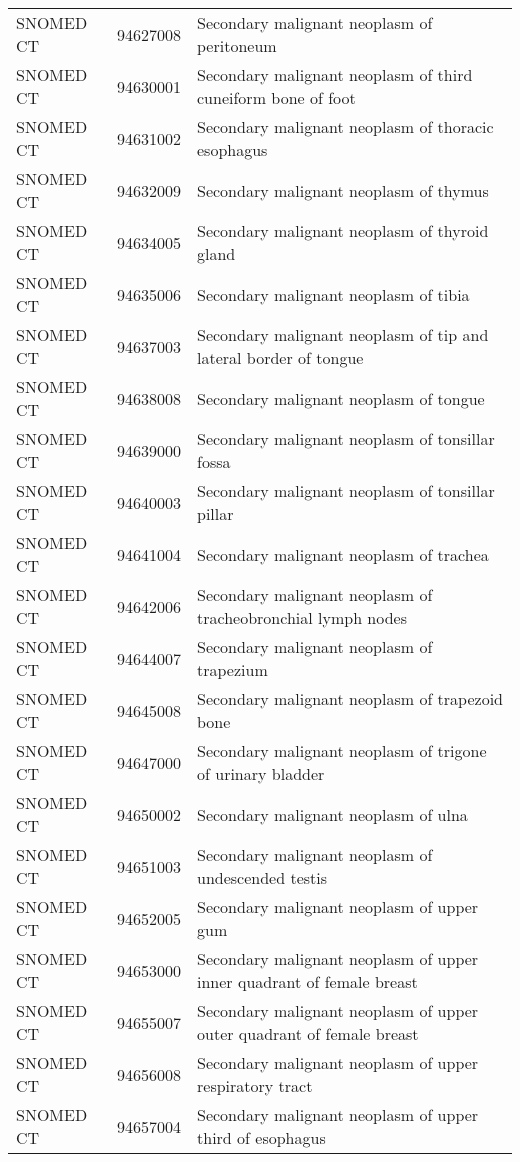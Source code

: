 \begin{longtable}{p{}p{}p{}}
  SNOMED CT & 94627008 & Secondary malignant neoplasm of peritoneum \\ 
  SNOMED CT & 94630001 & Secondary malignant neoplasm of third cuneiform bone of foot \\ 
  SNOMED CT & 94631002 & Secondary malignant neoplasm of thoracic esophagus \\ 
  SNOMED CT & 94632009 & Secondary malignant neoplasm of thymus \\ 
  SNOMED CT & 94634005 & Secondary malignant neoplasm of thyroid gland \\ 
  SNOMED CT & 94635006 & Secondary malignant neoplasm of tibia \\ 
  SNOMED CT & 94637003 & Secondary malignant neoplasm of tip and lateral border of tongue \\ 
  SNOMED CT & 94638008 & Secondary malignant neoplasm of tongue \\ 
  SNOMED CT & 94639000 & Secondary malignant neoplasm of tonsillar fossa \\ 
  SNOMED CT & 94640003 & Secondary malignant neoplasm of tonsillar pillar \\ 
  SNOMED CT & 94641004 & Secondary malignant neoplasm of trachea \\ 
  SNOMED CT & 94642006 & Secondary malignant neoplasm of tracheobronchial lymph nodes \\ 
  SNOMED CT & 94644007 & Secondary malignant neoplasm of trapezium \\ 
  SNOMED CT & 94645008 & Secondary malignant neoplasm of trapezoid bone \\ 
  SNOMED CT & 94647000 & Secondary malignant neoplasm of trigone of urinary bladder \\ 
  SNOMED CT & 94650002 & Secondary malignant neoplasm of ulna \\ 
  SNOMED CT & 94651003 & Secondary malignant neoplasm of undescended testis \\ 
  SNOMED CT & 94652005 & Secondary malignant neoplasm of upper gum \\ 
  SNOMED CT & 94653000 & Secondary malignant neoplasm of upper inner quadrant of female breast \\ 
  SNOMED CT & 94655007 & Secondary malignant neoplasm of upper outer quadrant of female breast \\ 
  SNOMED CT & 94656008 & Secondary malignant neoplasm of upper respiratory tract \\ 
  SNOMED CT & 94657004 & Secondary malignant neoplasm of upper third of esophagus \\ 

\end{longtable}
